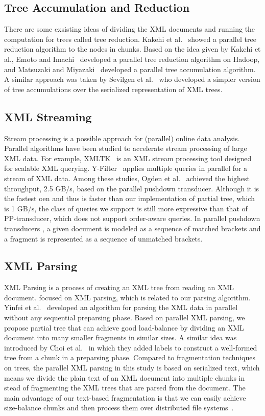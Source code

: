 \subsection{Tree Accumulation and Reduction}

There are some exsisting ideas of dividing the XML documents and running the
computation for trees called tree reduction. Kakehi et al.~\cite{KaME07} showed
a parallel tree reduction algorithm to the nodes in chunks. Based on the idea
given by Kakehi et al., Emoto and Imachi~\cite{EmIm12} developed a parallel tree
reduction algorithm on Hadoop, and Matsuzaki and Miyazaki~\cite{MaMi16}
developed a parallel tree accumulation algorithm. A similar approach was taken
by Sevilgen et al.~\cite{SAFu05} who developed a simpler version of tree
accumulations over the serialized representation of XML trees.

\subsection{XML Streaming}

Stream processing is a possible approach for (parallel) online data analysis.
Parallel algorithms have been studied to accelerate stream processing of large
XML data. For example, XMLTK~\cite{AGGR02} is an XML stream processing tool
designed for scalable XML querying. Y-Filter~\cite{ZhPC10} applies multiple
queries in parallel for a stream of XML data. Among these studies, Ogden et
al.~\cite{OgTP13} achieved the highest throughput, 2.5 GB/s, based on the
parallel pushdown transducer. Although it is the fastest oen and thus is faster
than our implementation of partial tree, which is 1 GB/s, the class of queries
we support is still more expressive than that of PP-transducer, which does not
support order-aware queries. In parallel pushdown transducers \cite{LiZZ17}, a
given document is modeled as a sequence of matched brackets and a fragment is
represented as a sequence of unmatched brackets.

\subsection{XML Parsing}

XML Parsing is a process of creating an XML tree from reading an XML document.
\cite{PLZC07,WZYu08} focused on XML parsing, which is related to our parsing
algorithm. Yinfei et al.~\cite{PaZC08} developed an algorithm for parsing the
XML data in parallel without any sequential preparsing phase.  Based on parallel
XML parsing, we propose partial tree that can achieve good load-balance by
dividing an XML document into many smaller fragments in similar sizes. A
similar idea was introduced by Choi et al.~\cite{ChLL14} in which they added
labels to construct a well-formed tree from a chunk in a preparsing phase. Compared to
fragmentation techniques on trees, the parallel XML parsing in  this study is
based on serialized text, which means we divide the plain text of an XML
document into multiple chunks in stead of fragmenting the  XML trees that are
parsed from the document.  The main advantage of our text-based fragmentation is
that we can easily achieve size-balance chunks and then process them over
distributed file systems~\cite{dfs}. 

